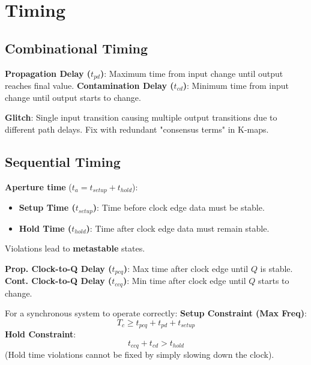 \section{Timing}

\subsection{Combinational Timing}

\begin{definition}
\textbf{Propagation Delay ($t_{pd}$)}: Maximum time from input change until output reaches final value.
\textbf{Contamination Delay ($t_{cd}$)}: Minimum time from input change until output starts to change.
\end{definition}

\begin{example}
\textbf{Glitch}: Single input transition causing multiple output transitions due to different path delays. Fix with redundant "consensus terms" in K-maps.
\end{example}

\subsection{Sequential Timing}

\begin{definition}
\textbf{Aperture time} ($t_a = t_{setup} + t_{hold}$):
\begin{itemize}
    \item \textbf{Setup Time ($t_{setup}$)}: Time before clock edge data must be stable.
    \item \textbf{Hold Time ($t_{hold}$)}: Time after clock edge data must remain stable.
\end{itemize}
Violations lead to \textbf{metastable} states.
\end{definition}

\begin{definition}
\textbf{Prop. Clock-to-Q Delay ($t_{pcq}$)}: Max time after clock edge until $Q$ is stable.
\textbf{Cont. Clock-to-Q Delay ($t_{ccq}$)}: Min time after clock edge until $Q$ starts to change.
\end{definition}

\begin{theorem}
For a synchronous system to operate correctly:
\textbf{Setup Constraint (Max Freq)}: $$T_c \geq t_{pcq} + t_{pd} + t_{setup}$$
\textbf{Hold Constraint}: $$t_{ccq} + t_{cd} > t_{hold}$$
(Hold time violations cannot be fixed by simply slowing down the clock).
\end{theorem}

